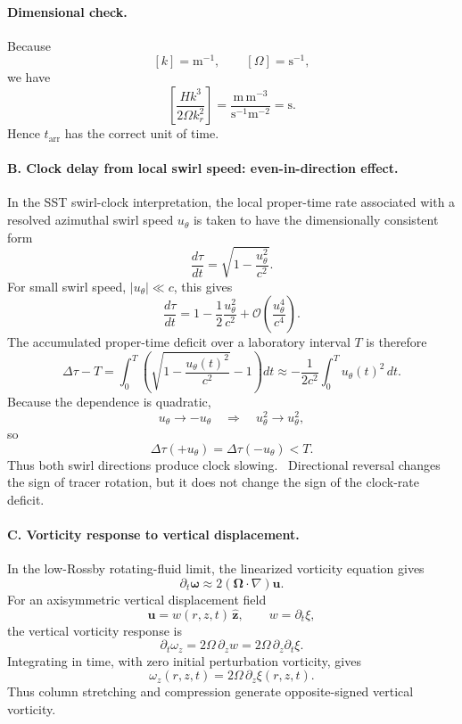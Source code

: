 \paragraph{Dimensional check.}
Because
\[
[k]=\mathrm{m^{-1}},
\qquad
[\Omega]=\mathrm{s^{-1}},
\]
we have
\[
\left[
\frac{Hk^3}{2\Omega k_r^2}
\right]
=
\frac{\mathrm{m}\,\mathrm{m^{-3}}}
{\mathrm{s^{-1}}\mathrm{m^{-2}}}
=
\mathrm{s}.
\]
Hence \(t_{\mathrm{arr}}\) has the correct unit of time.

\paragraph{B. Clock delay from local swirl speed: even-in-direction effect.}

In the SST swirl-clock interpretation, the local proper-time rate associated
with a resolved azimuthal swirl speed \(u_\theta\) is taken to have the
dimensionally consistent form
\[
\boxed{
\frac{d\tau}{dt}
=
\sqrt{1-\frac{u_\theta^2}{c^2}}.
}
\]
For small swirl speed, \(|u_\theta|\ll c\), this gives
\[
\frac{d\tau}{dt}
=
1-\frac{1}{2}\frac{u_\theta^2}{c^2}
+\mathcal O\!\left(\frac{u_\theta^4}{c^4}\right).
\]
The accumulated proper-time deficit over a laboratory interval \(T\) is
therefore
\[
\Delta\tau-T
=
\int_0^T
\left(
\sqrt{1-\frac{u_\theta(t)^2}{c^2}}-1
\right)dt
\approx
-\frac{1}{2c^2}
\int_0^T u_\theta(t)^2\,dt .
\]
Because the dependence is quadratic,
\[
u_\theta\rightarrow -u_\theta
\quad\Longrightarrow\quad
u_\theta^2\rightarrow u_\theta^2,
\]
so
\[
\boxed{
\Delta\tau(+u_\theta)=\Delta\tau(-u_\theta)<T.
}
\]
Thus both swirl directions produce clock slowing.  Directional reversal changes
the sign of tracer rotation, but it does not change the sign of the clock-rate
deficit.

\paragraph{C. Vorticity response to vertical displacement.}

In the low-Rossby rotating-fluid limit, the linearized vorticity equation gives
\[
\partial_t\boldsymbol\omega
\approx
2(\boldsymbol\Omega\cdot\nabla)\mathbf u .
\]
For an axisymmetric vertical displacement field
\[
\mathbf u = w(r,z,t)\,\hat{\mathbf z},
\qquad
w=\partial_t\xi,
\]
the vertical vorticity response is
\[
\partial_t\omega_z
=
2\Omega\,\partial_z w
=
2\Omega\,\partial_z\partial_t\xi .
\]
Integrating in time, with zero initial perturbation vorticity, gives
\[
\boxed{
\omega_z(r,z,t)
=
2\Omega\,\partial_z\xi(r,z,t).
}
\]
Thus column stretching and compression generate opposite-signed vertical
vorticity.

